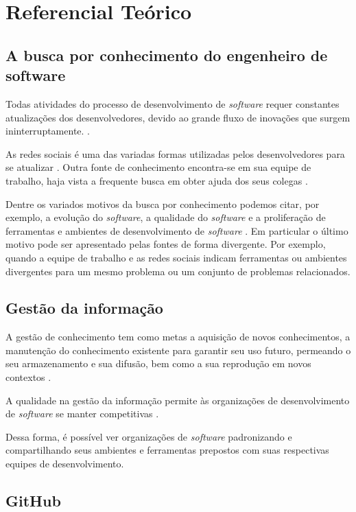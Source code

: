 \chapter{Referencial Teórico}

\section{A busca por conhecimento do engenheiro de software}

Todas atividades do processo de desenvolvimento de \textit{software} requer constantes atualizações dos desenvolvedores, devido ao grande fluxo de inovações que surgem ininterruptamente. \cite{Singer2014}.

As redes sociais é uma das variadas formas utilizadas pelos desenvolvedores para se atualizar \cite{Treude2012} \cite{Storey:2014:ESM:2593882.2593887}. Outra fonte de conhecimento encontra-se em sua equipe de trabalho, haja vista a frequente busca em obter ajuda dos seus colegas \cite{Weinberg1998}.

Dentre os variados motivos da busca por conhecimento podemos citar, por exemplo, a evolução do \textit{software}, a qualidade do \textit{software} e a proliferação de ferramentas e ambientes de desenvolvimento de \textit{software} \cite{Jazayeri:2004:ESE:1025115.1025201}. Em particular o último motivo pode ser apresentado pelas fontes de forma divergente. Por exemplo, quando a equipe de trabalho e as redes sociais indicam ferramentas ou ambientes divergentes para um mesmo problema ou um conjunto de problemas relacionados.

\section{Gestão da informação} 

A gestão de conhecimento tem como metas a aquisição de novos conhecimentos, a manutenção do conhecimento existente para garantir seu uso futuro, permeando o seu armazenamento e sua difusão, bem como a sua reprodução em novos contextos \cite{Bjornson2008}.

A qualidade na gestão da informação permite às organizações de desenvolvimento de \textit{software} se manter competitivas \cite{Rabelo2015}.

Dessa forma, é possível ver organizações de \textit{software} padronizando e compartilhando seus ambientes e ferramentas prepostos com suas respectivas equipes de desenvolvimento.

\section{GitHub}

